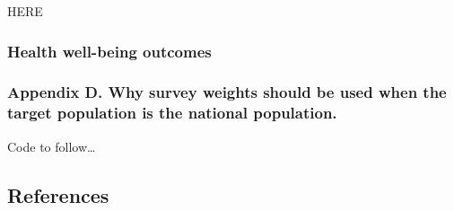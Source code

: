 \documentclass[
  singlecolumn]{article}
\begin{document}
HERE

\subsubsection{Health well-being
outcomes}\label{health-well-being-outcomes}

\subsubsection{Appendix D. Why survey weights should be used when the
target population is the national
population.}\label{appendix-d.-why-survey-weights-should-be-used-when-the-target-population-is-the-national-population.}

Code to follow\ldots{}

\newpage{}

\subsection*{References}\label{references}
\end{document}
